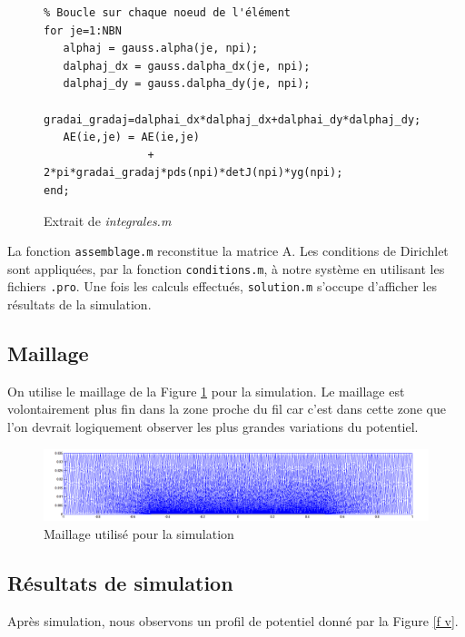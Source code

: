 \documentclass[a4paper,12pt]{article}
\begin{document}

%                         
\begin{figure}[h]
\begin{verbatim}
% Boucle sur chaque noeud de l'élément  
for je=1:NBN
   alphaj = gauss.alpha(je, npi);
   dalphaj_dx = gauss.dalpha_dx(je, npi);
   dalphaj_dy = gauss.dalpha_dy(je, npi);
   gradai_gradaj=dalphai_dx*dalphaj_dx+dalphai_dy*dalphaj_dy;
   AE(ie,je) = AE(ie,je)
   				+ 2*pi*gradai_gradaj*pds(npi)*detJ(npi)*yg(npi);
end;
\end{verbatim}
\caption{Extrait de \emph{integrales.m}}
\end{figure}

La fonction \verb|assemblage.m| reconstitue la matrice A. Les conditions de Dirichlet sont appliquées, par la fonction \verb|conditions.m|, à notre système en utilisant les fichiers \verb|.pro|. Une fois les calculs effectués, \verb|solution.m| s'occupe d'afficher les résultats de la simulation.


\subsection{Maillage}
On utilise le maillage de la Figure \ref{f mesh} pour la simulation. Le maillage est volontairement plus fin dans la zone proche du fil car c'est dans cette zone que l'on devrait logiquement observer les plus grandes variations du potentiel.
\begin{figure}[h]
\centering
\includegraphics[width=1\textwidth,height=0.25 \textwidth]{images/mesh}
\caption{Maillage utilisé pour la simulation}
\label{f mesh}
\end{figure}

\subsection{Résultats de simulation}
Après simulation, nous observons un profil de potentiel donné par la Figure \ref{f v}.
\end{document}
